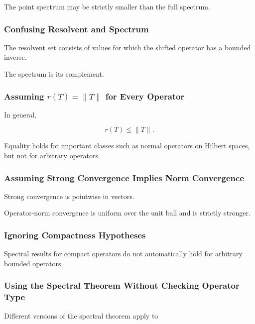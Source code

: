 The point spectrum may be strictly smaller than the full spectrum.

\subsubsection{Confusing Resolvent and Spectrum}

The resolvent set consists of values for which the shifted operator has a
bounded inverse.

The spectrum is its complement.

\subsubsection{Assuming \(r(T)=\|T\|\) for Every Operator}

In general,

\[
\boxed{
r(T)\leq\|T\|.
}
\]

Equality holds for important classes such as normal operators on Hilbert
spaces, but not for arbitrary operators.

\subsubsection{Assuming Strong Convergence Implies Norm Convergence}

Strong convergence is pointwise in vectors.

Operator-norm convergence is uniform over the unit ball and is strictly
stronger.

\subsubsection{Ignoring Compactness Hypotheses}

Spectral results for compact operators do not automatically hold for
arbitrary bounded operators.

\subsubsection{Using the Spectral Theorem Without Checking Operator Type}

Different versions of the spectral theorem apply to

